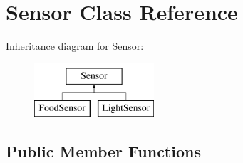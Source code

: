 \hypertarget{class_sensor}{}\section{Sensor Class Reference}
\label{class_sensor}
Inheritance diagram for Sensor\+:\begin{figure}[H]
\begin{center}
\leavevmode
\includegraphics[height=2.000000cm]{class_sensor}
\end{center}
\end{figure}
\subsection*{Public Member Functions}
